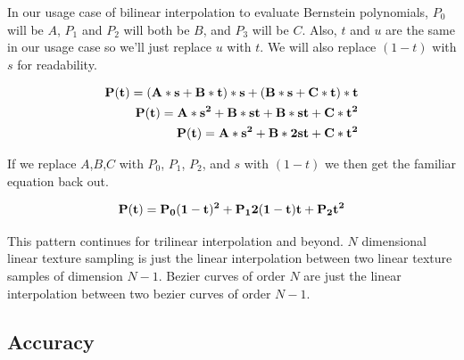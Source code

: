\documentclass{jcgt}
\begin{document}
In our usage case of bilinear interpolation to evaluate Bernstein polynomials, $P_0$ will be $A$, $P_1$ and $P_2$ will both be $B$, and $P_3$ will be $C$.  Also, $t$ and $u$ are the same in our usage case so we'll just replace $u$ with $t$.  We will also replace $(1-t)$ with $s$ for readability.

\begin{equation}
\begin{split}
\bf{P(t)} = (A*s+B*t)*s + (B*s+C*t)*t \\
\bf{P(t)} = A*s^2+B*st + B*st+C*t^2 \\
\bf{P(t)} = A*s^2+B*2st+C*t^2
\end{split}
\label{eqn:bilinearinterpolation2}
\end{equation}

If we replace $A$,$B$,$C$ with $P_0$, $P_1$, $P_2$, and $s$ with $(1-t)$ we then get the familiar equation back out.

\begin{equation}
\bf{P(t)} = P_0(1-t)^2+P_12(1-t)t+P_2t^2
\label{eqn:bilinearinterpolation3}
\end{equation}

This pattern continues for trilinear interpolation and beyond.  $N$ dimensional linear texture sampling is just the linear interpolation between two linear texture samples of dimension $N-1$.  Bezier curves of order $N$ are just the linear interpolation between two bezier curves of order $N-1$.

\subsection{Accuracy}
\end{document}
